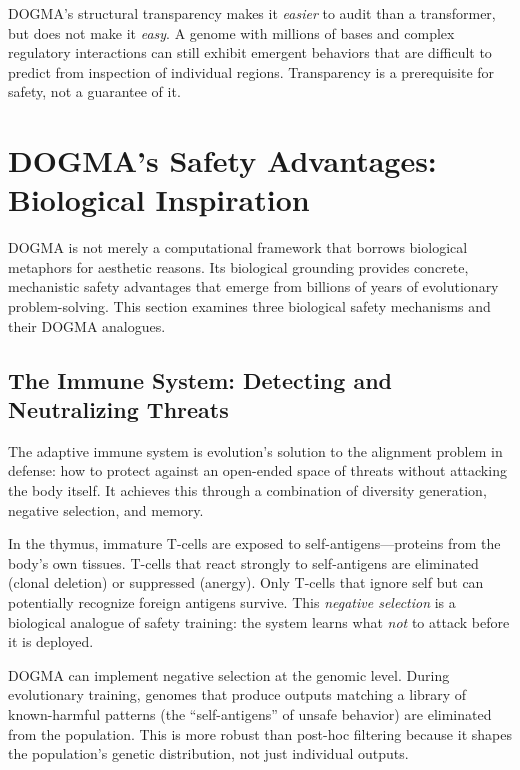 \begin{keyinsight}
DOGMA's structural transparency makes it \emph{easier} to audit than a transformer, but does not make it \emph{easy}.
A genome with millions of bases and complex regulatory interactions can still exhibit emergent behaviors that are difficult to predict from inspection of individual regions.
Transparency is a prerequisite for safety, not a guarantee of it.
\end{keyinsight}

\section{DOGMA's Safety Advantages: Biological Inspiration}
\label{sec:dogma-safety}

DOGMA is not merely a computational framework that borrows biological metaphors for aesthetic reasons.
Its biological grounding provides concrete, mechanistic safety advantages that emerge from billions of years of evolutionary problem-solving.
This section examines three biological safety mechanisms and their DOGMA analogues.

\subsection{The Immune System: Detecting and Neutralizing Threats}

The adaptive immune system is evolution's solution to the alignment problem in defense: how to protect against an open-ended space of threats without attacking the body itself.
It achieves this through a combination of diversity generation, negative selection, and memory.

\begin{bioinsight}
In the thymus, immature T-cells are exposed to self-antigens---proteins from the body's own tissues.
T-cells that react strongly to self-antigens are eliminated (clonal deletion) or suppressed (anergy).
Only T-cells that ignore self but can potentially recognize foreign antigens survive.
This \emph{negative selection} is a biological analogue of safety training: the system learns what \emph{not} to attack before it is deployed.

DOGMA can implement negative selection at the genomic level.
During evolutionary training, genomes that produce outputs matching a library of known-harmful patterns (the ``self-antigens'' of unsafe behavior) are eliminated from the population.
This is more robust than post-hoc filtering because it shapes the population's genetic distribution, not just individual outputs.
\end{bioinsight}

